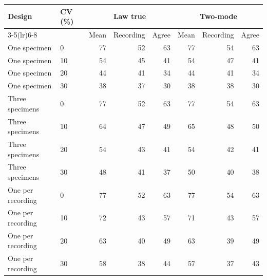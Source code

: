 \begin{tabular}{llrrrrrr}
\toprule
Design & CV (\%) & \multicolumn{3}{c}{Law true} & \multicolumn{3}{c}{Two-mode} \\
\cmidrule(lr){3-5}\cmidrule(lr){6-8}
 & & Mean & Recording & Agree & Mean & Recording & Agree \\
\midrule
One specimen & 0 & 77 & 52 & 63 & 77 & 54 & 63 \\
One specimen & 10 & 54 & 45 & 41 & 54 & 47 & 41 \\
One specimen & 20 & 44 & 41 & 34 & 44 & 41 & 34 \\
One specimen & 30 & 38 & 37 & 30 & 38 & 38 & 30 \\
\midrule
Three specimens & 0 & 77 & 52 & 63 & 77 & 54 & 63 \\
Three specimens & 10 & 64 & 47 & 49 & 65 & 48 & 50 \\
Three specimens & 20 & 54 & 43 & 41 & 54 & 42 & 41 \\
Three specimens & 30 & 48 & 41 & 37 & 50 & 40 & 38 \\
\midrule
One per recording & 0 & 77 & 52 & 63 & 77 & 54 & 63 \\
One per recording & 10 & 72 & 43 & 57 & 71 & 43 & 57 \\
One per recording & 20 & 63 & 40 & 49 & 63 & 39 & 49 \\
One per recording & 30 & 58 & 38 & 44 & 57 & 37 & 43 \\
\bottomrule
\end{tabular}
